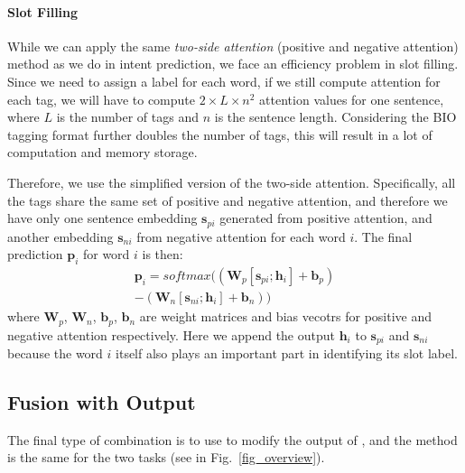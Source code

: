 \paragraph{Slot Filling}
While we can apply the same \emph{two-side attention} (positive and negative attention) method as we do in intent prediction, we face an efficiency problem in slot filling. Since we need to assign a label for each word, if we still compute attention for each tag, we will have to compute $2\times L \times n^2$ attention values for one sentence, where $L$ is the number of tags and $n$ is the sentence length. Considering the BIO tagging format further doubles the number of tags, this will result in a lot of computation and memory storage. 

Therefore, we use the simplified version of the two-side attention. Specifically, all the tags share the same set of positive and negative attention, and therefore we have only one sentence embedding $\textbf{s}_{pi}$ generated from positive attention, and another embedding $\textbf{s}_{ni}$ from negative attention for each word $i$. The final prediction $\textbf{p}_i$ for word $i$ is then:
\begin{equation}
\begin{split}
\textbf{p}_i = softmax((\textbf{W}_p [\textbf{s}_{pi}; \textbf{h}_i] + \textbf{b}_p) \\- (\textbf{W}_n [\textbf{s}_{ni}; \textbf{h}_i] + \textbf{b}_n))
\end{split} 
\end{equation} 
where $\textbf{W}_{p}$, $\textbf{W}_{n}$, $\textbf{b}_{p}$, $\textbf{b}_{n}$ are weight matrices and bias vecotrs for positive and negative attention respectively. Here we append the \BLSTM output $\textbf{h}_i$ to $\textbf{s}_{pi}$ and $\textbf{s}_{ni}$ because the word $i$ itself also plays an important part in identifying its slot label.

\subsection{Fusion with Output}
\label{fusion_with_output}
The final type of combination is to use \RE to modify the output of \NN, and the method is the same for the two tasks (see  in Fig.~\ref{fig_overview}). 


